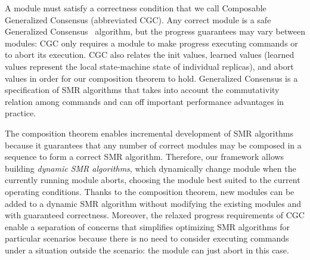 A module must satisfy a correctness condition that we call Composable
Generalized Consensus (abbreviated CGC). Any correct module is a safe
Generalized Consensus~\cite{Lamport05GeneralizeConsensus} algorithm, but the progress guarantees may vary between
modules: CGC only requires a module to make progress executing commands or to
abort its execution. CGC also relates the init values, learned values (learned values represent the local state-machine state of individual replicas), and abort values in order for our composition theorem to hold. 
Generalized Consensus is a specification of SMR algorithms that takes into account the commutativity relation among commands and can off important performance advantages in practice. 

The composition theorem enables incremental development of SMR algorithms
because it guarantees that any number of correct modules may be composed in
a sequence to form a correct SMR algorithm. Therefore, our framework allows
building \emph{dynamic SMR algorithms}, which dynamically change module when
the currently running module aborts, choosing the module best suited to the
current operating conditions. Thanks to the composition theorem, new modules can
be added to a dynamic SMR algorithm without modifying the existing modules and
with guaranteed correctness. Moreover, the relaxed progress requirements of CGC
enable a separation of concerns that simplifies optimizing SMR algorithms for
particular scenarios because there is no need to consider executing commands
under a situation outside the scenario: the module can just abort in this case.

